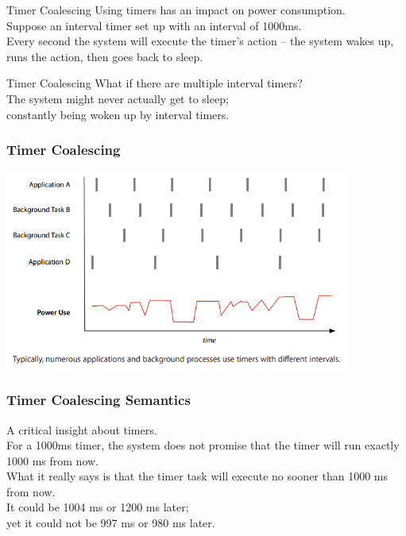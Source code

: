 \documentclass[aspectratio=169]{beamer}
\begin{document}
\begin{frame}{Timer Coalescing}
\large
Using timers has an impact on power consumption.  \\
\vspace{1em}
Suppose an interval timer set up with an interval of 1000ms. \\
\vspace{1em}
Every second the system will execute the timer's action -- the system wakes up, runs the action, then goes back to sleep. \\
\end{frame}



\begin{frame}{Timer Coalescing}
\Large
What if there are multiple interval timers? \\
\vspace{1em}
The system might never actually get to sleep; \\
\quad constantly being woken up by interval timers.
\end{frame}




\begin{frame}
\frametitle{Timer Coalescing}
\begin{center}
	\includegraphics[width=0.85\textwidth]{img/coalesced_before.png}
\end{center}
\end{frame}





\begin{frame}
\frametitle{Timer Coalescing Semantics}
A critical insight about timers. \\
\vspace{1em}
For a 1000ms timer, the system does not promise that the timer will run exactly 1000 ms from now. \\
\vspace{1em}
What it really says is that the timer task will execute \alert{no sooner than} 1000 ms from now. \\
\vspace{1em}
It could be 1004 ms or 1200 ms later;\\
\quad yet it could not be 997 ms or 980 ms later.
\end{frame}
\end{document}
